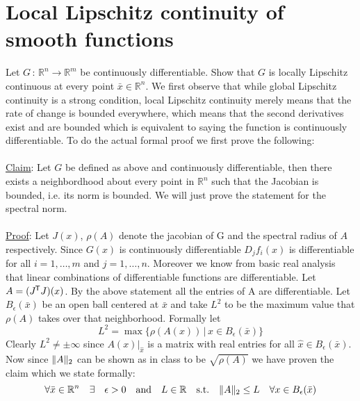 \documentclass{article}
\DeclarePairedDelimiter{\norm}{\lVert}{\rVert}
\newcommand*{\tran}{^{\mkern-1.5mu\mathsf{T}}}%
\begin{document}
	\clearpage
	
	\section{Local Lipschitz continuity of smooth functions}
	Let $G \, : \, \mathbb R^n \rightarrow \mathbb R^m $ be continuously differentiable. Show that $G$ is locally Lipschitz continuous at every point $\bar x \in \mathbb R^n$. We first observe that while global Lipschitz continuity is a strong condition, local Lipschitz continuity merely means that the rate of change is bounded everywhere, which means that the second derivatives exist and are bounded which is equivalent to saying the function is continuously differentiable. To do the actual formal proof we first prove the following:\\
	\\
	\underline{Claim}: Let $G$ be defined as above and continuously differentiable, then there exists a neighbordhood about every point in $\mathbb R^n$ such that the Jacobian is bounded, i.e. its norm is bounded. We will just prove the statement for the spectral norm.\\
	\\
	\underline{Proof}: Let $J(x)$, $\rho(A)$ denote the jacobian of G and the spectral radius of $A$ respectively. Since $G(x)$ is continuously differentiable $D_j f_i(x)$ is differentiable for all $i = 1,\ldots, m$ and $j = 1,\ldots,n$. Moreover we know from basic real analysis that linear combinations of differentiable functions are differentiable. Let $A = (J\tran J)(x)$. By the above statement all the entries of A are differentiable. Let $B_\epsilon (\bar x)$ be an open ball centered at $\bar x$ and take $L^2$ to be the maximum value that $\rho(A)$ takes over that neighborhood. Formally let
	\begin{equation}\label{defineL}
		L^2 = \max\{\rho(A(x)) \, \vert \, x \in B_\epsilon (\bar x) \}
	\end{equation}
	Clearly $L^2 \neq \pm \infty$ since $A(x)\vert_{\hat x }$ is a matrix with real entries for all $\hat x \in B_\epsilon (\bar x)$. Now since $\norm A_2$ can be shown as in class to be $\sqrt{\rho(A)}$ we have proven the claim which we state formally:
	\begin{equation}\label{bounded}
		\forall \bar x \in \mathbb{R}^n \quad \exists \quad \epsilon >0 \quad \text{and} \quad L\in \mathbb R \quad   \text{s.t.} \quad \norm A_2 \leq  L \quad \forall x\in B_\epsilon(\bar x)
	\end{equation}
\end{document}
